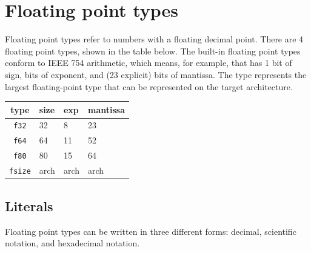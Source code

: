 \section{Floating point types}
\label{sec:(chap3):floats}

Floating point types refer to numbers with a floating decimal point. There are 4
floating point types, shown in the table below. The built-in floating point
types conform to IEEE 754 arithmetic, which means, for example, that
 has 1 bit of sign,  bits of exponent, and  (23
explicit) bits of mantissa. The  type represents the largest
floating-point type that can be represented on the target architecture.

\begin{center}
  \begin{tabular}{|c|lll|}
    \hline
    type & size & exp & mantissa\\[0pt]
    \hline
    \hline
    \texttt{f32} & 32 & 8 & 23\\[0pt]
    \texttt{f64} & 64 & 11 & 52\\[0pt]
    \texttt{f80} & 80 & 15 & 64\\[0pt]
    \texttt{fsize} & arch & arch & arch\\[0pt]
    \hline
  \end{tabular}
\end{center}

\subsection{Literals}
\label{sec:orgfd9f825}

Floating point types can be written in three different forms: decimal,
scientific notation, and hexadecimal notation.

